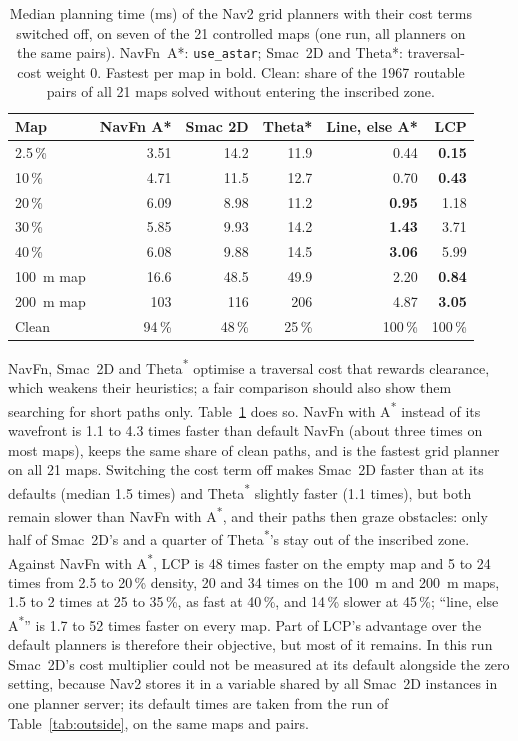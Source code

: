 \documentclass[conference]{IEEEtran}
\newcommand{\lcp}{LCP}
\begin{document}
\begin{table}[t]
\centering
\caption{Median planning time (ms) of the Nav2 grid planners with their cost terms
switched off, on seven of the 21 controlled maps (one run, all planners on the same
pairs). NavFn~A*: \texttt{use\_astar}; Smac~2D and Theta*: traversal-cost weight 0.
Fastest per map in bold. Clean: share of the \num{1967} routable pairs of all 21 maps
solved without entering the inscribed zone.}
\label{tab:tuned}
\setlength{\tabcolsep}{3pt}
\begin{tabular}{@{}lrrrrr@{}}
\toprule
Map & NavFn A* & Smac 2D & Theta* & Line, else A* & \lcp{} \\
\midrule
2.5\,\%          & 3.51 & 14.2 & 11.9 & 0.44 & \textbf{0.15} \\
10\,\%           & 4.71 & 11.5 & 12.7 & 0.70 & \textbf{0.43} \\
20\,\%           & 6.09 & 8.98 & 11.2 & \textbf{0.95} & 1.18 \\
30\,\%           & 5.85 & 9.93 & 14.2 & \textbf{1.43} & 3.71 \\
40\,\%           & 6.08 & 9.88 & 14.5 & \textbf{3.06} & 5.99 \\
\SI{100}{m} map  & 16.6 & 48.5 & 49.9 & 2.20 & \textbf{0.84} \\
\SI{200}{m} map  & 103  & 116  & 206  & 4.87 & \textbf{3.05} \\
\midrule
Clean            & 94\,\% & 48\,\% & 25\,\% & 100\,\% & 100\,\% \\
\bottomrule
\end{tabular}
\end{table}

NavFn, Smac~2D and Theta\textsuperscript{*} optimise a traversal cost that rewards
clearance, which weakens their heuristics; a fair comparison should also show them
searching for short paths only. Table~\ref{tab:tuned} does so. NavFn with
A\textsuperscript{*} instead of its wavefront is 1.1 to 4.3 times faster than
default NavFn (about three times on most maps), keeps the same share of clean paths,
and is the fastest grid planner on all 21 maps. Switching the cost term off makes
Smac~2D faster than at its defaults (median 1.5 times) and Theta\textsuperscript{*}
slightly faster (1.1 times), but both remain slower than NavFn with
A\textsuperscript{*}, and their paths then graze obstacles: only half of Smac~2D's
and a quarter of Theta\textsuperscript{*}'s stay out of the inscribed zone. Against
NavFn with A\textsuperscript{*}, \lcp{} is 48 times faster on the empty map and 5 to
24 times from 2.5 to 20\,\% density, 20 and 34 times on the \SI{100}{m} and \SI{200}{m} maps, 1.5 to 2 times at
25 to 35\,\%, as fast at 40\,\%, and 14\,\% slower at 45\,\%; ``line, else
A\textsuperscript{*}'' is 1.7 to 52 times faster on every map. Part of \lcp{}'s
advantage over the default planners is therefore their objective, but most of it
remains. In this run Smac~2D's cost multiplier could not be measured at its default
alongside the zero setting, because Nav2 stores it in a variable shared by all Smac~2D
instances in one planner server; its default times are taken from the run of
Table~\ref{tab:outside}, on the same maps and pairs.
\end{document}

